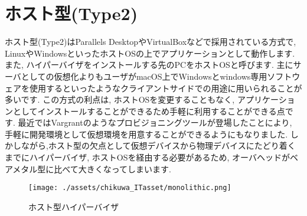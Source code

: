 \section{ホスト型(Type2)}
ホスト型(Type2)はParallels DesktopやVirtualBoxなどで採用されている方式で, LinuxやWindowsといったホストOSの上でアプリケーションとして動作します. また, ハイパーバイザをインストールする先のPCをホストOSと呼びます. 主にサーバとしての仮想化よりもユーザがmacOS上でWindowsとwindows専用ソフトウェアを使用するといったようなクライアントサイドでの用途に用いられることが多いです. この方式の利点は, ホストOSを変更することもなく, アプリケーションとしてインストールすることができるため手軽に利用することができる点です. 最近ではVargrantのようなプロビジョニングツールが登場したことにより, 手軽に開発環境として仮想環境を用意することができるようにもなりました. しかしながら,ホスト型の欠点として仮想デバイスから物理デバイスにたどり着くまでにハイパーバイザ, ホストOSを経由する必要があるため, オーバヘッドがベアメタル型に比べて大きくなってしまいます.
\begin{figure}[htbp]
    \centering
    \texttt{[image: ./assets/chikuwa\_ITasset/monolithic.png]}
    \caption{ホスト型ハイパーバイザ}
    \label{fig:hosthypervisor}
\end{figure}

